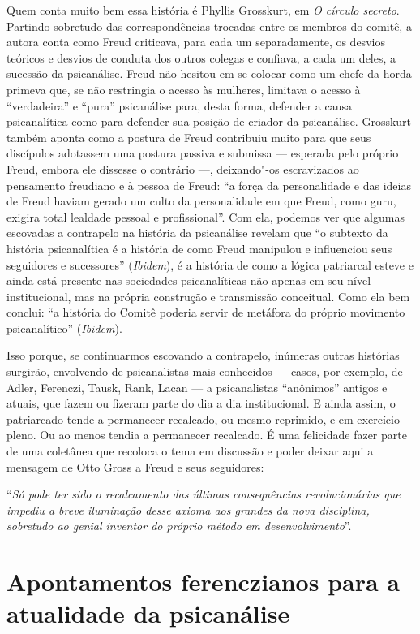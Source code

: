 Quem conta muito bem essa história é Phyllis Grosskurt, em \emph{O
círculo secreto}. Partindo sobretudo das correspondências trocadas
entre os membros do comitê, a autora conta como Freud criticava, para
cada um separadamente, os desvios teóricos e desvios de conduta dos
outros colegas e confiava, a cada um deles, a sucessão da psicanálise.
Freud não hesitou em se colocar como um chefe da horda primeva que, se
não restringia o acesso às mulheres, limitava o acesso à ``verdadeira''
e ``pura'' psicanálise para, desta forma, defender a causa psicanalítica
como para defender sua posição de criador da psicanálise. Grosskurt
também aponta como a postura de Freud contribuiu muito para que seus
discípulos adotassem uma postura passiva e submissa --- esperada pelo
próprio Freud, embora ele dissesse o contrário ---, deixando"-os
escravizados ao pensamento freudiano e à pessoa de Freud: ``a força da
personalidade e das ideias de Freud haviam gerado um culto da
personalidade em que Freud, como guru, exigira total lealdade pessoal e
profissional''. Com ela, podemos ver que algumas escovadas a contrapelo
na história da psicanálise revelam que ``o subtexto da história
psicanalítica é a história de como Freud manipulou e influenciou seus
seguidores e sucessores'' (\emph{Ibidem}), é a história de como a lógica
patriarcal esteve e ainda está presente nas sociedades psicanalíticas
não apenas em seu nível institucional, mas na própria construção e
transmissão conceitual. Como ela bem conclui: ``a história do Comitê
poderia servir de metáfora do próprio movimento psicanalítico''
(\emph{Ibidem}).

Isso porque, se continuarmos escovando a contrapelo, inúmeras outras
histórias surgirão, envolvendo de psicanalistas mais conhecidos ---
casos, por exemplo, de Adler, Ferenczi, Tausk, Rank, Lacan --- a
psicanalistas ``anônimos'' antigos e atuais, que fazem ou fizeram parte
do dia a dia institucional. E ainda assim, o patriarcado tende a
permanecer recalcado, ou mesmo reprimido, e em exercício pleno. Ou ao
menos tendia a permanecer recalcado. É uma felicidade fazer parte de uma
coletânea que recoloca o tema em discussão e poder deixar aqui a
mensagem de Otto Gross a Freud e seus seguidores:

``\emph{Só pode ter sido o recalcamento das últimas consequências
revolucionárias que impediu a breve iluminação desse axioma aos grandes
da nova disciplina, sobretudo ao genial inventor do próprio método em
desenvolvimento}''.

\chapter*{Apontamentos ferenczianos para a atualidade da psicanálise}

